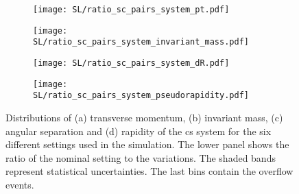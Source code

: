 \begin{figure}[H]
    \centering
    \begin{subfigure}{0.49\textwidth}
        \centering
        \texttt{[image: SL/ratio\_sc\_pairs\_system\_pt.pdf]}
        \caption{}
        \label{app:subfig:pt(sc)_SL}
    \end{subfigure}
    \begin{subfigure}{0.49\textwidth}
        \centering
        \texttt{[image: SL/ratio\_sc\_pairs\_system\_invariant\_mass.pdf]}
        \caption{}
        \label{app:subfig:m(sc)_SL}
    \end{subfigure}

    \vspace{0.2cm}
    
    \begin{subfigure}{0.49\textwidth}
        \centering
        \texttt{[image: SL/ratio\_sc\_pairs\_system\_dR.pdf]}
        \caption{}
        \label{app:subfig:dR(sc)_SL}
    \end{subfigure}
    \begin{subfigure}{0.49\textwidth}
        \centering
        \texttt{[image: SL/ratio\_sc\_pairs\_system\_pseudorapidity.pdf]}
        \caption{}
        \label{app:subfig:y(sc)_SL}
    \end{subfigure}
    \caption{Distributions of (a) transverse momentum, (b) invariant mass,  (c) angular separation and (d) rapidity of the cs system for the six different settings used in the simulation. The lower panel shows the ratio of the nominal setting to the variations. The shaded bands represent statistical uncertainties. The last bins contain the overflow events.}
    \label{app:fig:sc_SL}
\end{figure}

